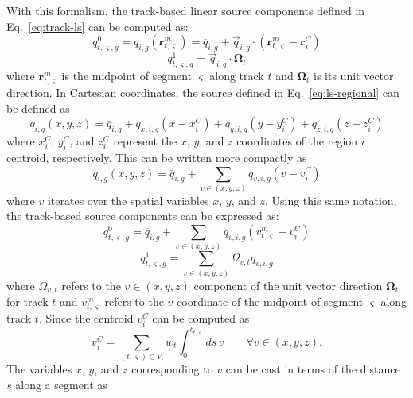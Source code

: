 With this formalism, the track-based linear source components defined in Eq.~\ref{eq:track-ls} can be computed as:
\begin{equation}
q^0_{t,\varsigma,g} = q_{i,g}(\mathbf{r}^m_{t,\varsigma}) = \overline{q}_{i,g} + \vec{q}_{i,g} \cdot \left( \mathbf{r}^m_{t,\varsigma} - \mathbf{r}^C_i \right)
\end{equation}
\begin{equation}
q^1_{t,\varsigma,g} = \vec{q}_{i,g} \cdot \mathbf{\Omega}_t
\end{equation}
where $\mathbf{r}^m_{t,\varsigma}$ is the midpoint of segment $\varsigma$ along track $t$ and $\mathbf{\Omega}_t$ is its unit vector direction. In Cartesian coordinates, the source defined in Eq.~\ref{eq:ls-regional} can be defined as
\begin{equation}
q_{i,g}(x, y, z) = \overline{q}_{i,g} + q_{x,i,g} \left( x - x^C_i \right) + q_{y,i,g} \left( y - y^C_i \right) + q_{z,i,g} \left( z - z^C_i \right)
\end{equation}
where $x^C_i$, $y^C_i$, and $z^C_i$ represent the $x$, $y$, and $z$ coordinates of the region $i$ centroid, respectively. This can be written more compactly as
\begin{equation}
q_{i,g}(x, y, z) = \overline{q}_{i,g} + \sum_{v \in (x,y,z)} q_{v,i,g} \left( v - v^C_i \right)
\end{equation}
where $v$ iterates over the spatial variables $x$, $y$, and $z$. Using this same notation, the track-based source components can be expressed as:
\begin{equation}
q^0_{t,\varsigma,g} = \overline{q}_{i,g} + \sum_{v \in (x,y,z)} q_{v,i,g} \left( v^m_{t,\varsigma} - v^C_i \right)
\label{eq:q0-def}
\end{equation}
\begin{equation}
q^1_{t,\varsigma,g} = \sum_{v \in (x,y,z)} \Omega_{v,t} q_{v,i,g}
\label{eq:q1-def}
\end{equation}
where $\Omega_{v,t}$ refers to the $v\in(x,y,z)$ component of the unit vector direction $\mathbf{\Omega}_t$ for track $t$ and $v^m_{t,\varsigma}$ refers to the $v$ coordinate of the midpoint of segment $\varsigma$ along track $t$. Since the centroid $v^C_i$ can be computed as
\begin{equation}
v^C_i = \sum_{(t,\varsigma) \in V_i} w_t \int_{0}^{\ell_{t,\varsigma}} ds \, v \qquad \forall v \in (x,y,z).
\label{eq:gen-centroid-int}
\end{equation}
The variables $x$, $y$, and $z$ corresponding to $v$ can be cast in terms of the distance $s$ along a segment as
